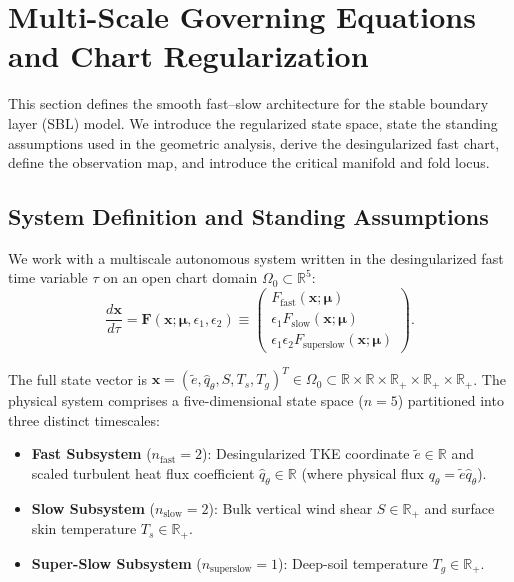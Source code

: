 \section{Multi-Scale Governing Equations and Chart Regularization}

This section defines the smooth fast--slow architecture for the stable boundary layer (SBL) model. We introduce the regularized state space, state the standing assumptions used in the geometric analysis, derive the desingularized fast chart, define the observation map, and introduce the critical manifold and fold locus.

\subsection{System Definition and Standing Assumptions}

We work with a multiscale autonomous system written in the desingularized fast time variable $\tau$ on an open chart domain $\Omega_0 \subset \mathbb{R}^5$:
\begin{equation}
\frac{d\mathbf{x}}{d\tau}
= \mathbf{F}(\mathbf{x};\boldsymbol{\mu},\epsilon_1,\epsilon_2)
\equiv
\begin{pmatrix}
F_{\mathrm{fast}}(\mathbf{x};\boldsymbol{\mu}) \\
\epsilon_1 F_{\mathrm{slow}}(\mathbf{x};\boldsymbol{\mu}) \\
\epsilon_1\epsilon_2 F_{\mathrm{superslow}}(\mathbf{x};\boldsymbol{\mu})
\end{pmatrix}.
\end{equation}

The full state vector is $\mathbf{x} = (\tilde e, \hat q_\theta, S, T_s, T_g)^T \in \Omega_0 \subset \mathbb{R} \times \mathbb{R} \times \mathbb{R}_+ \times \mathbb{R}_+ \times \mathbb{R}_+$. The physical system comprises a five-dimensional state space ($n = 5$) partitioned into three distinct timescales:
\begin{itemize}
    \item \textbf{Fast Subsystem} ($n_{\mathrm{fast}} = 2$): Desingularized TKE coordinate $\tilde e \in \mathbb{R}$ and scaled turbulent heat flux coefficient $\hat q_\theta \in \mathbb{R}$ (where physical flux $q_\theta = \tilde e \hat q_\theta$).
    \item \textbf{Slow Subsystem} ($n_{\mathrm{slow}} = 2$): Bulk vertical wind shear $S \in \mathbb{R}_+$ and surface skin temperature $T_s \in \mathbb{R}_+$.
    \item \textbf{Super-Slow Subsystem} ($n_{\mathrm{superslow}} = 1$): Deep-soil temperature $T_g \in \mathbb{R}_+$.
\end{itemize}

